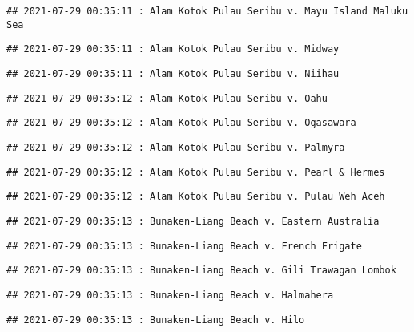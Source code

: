 \documentclass[
]{article}
\begin{document}
\begin{verbatim}
## 2021-07-29 00:35:11 : Alam Kotok Pulau Seribu v. Mayu Island Maluku Sea
\end{verbatim}

\begin{verbatim}
## 2021-07-29 00:35:11 : Alam Kotok Pulau Seribu v. Midway
\end{verbatim}

\begin{verbatim}
## 2021-07-29 00:35:11 : Alam Kotok Pulau Seribu v. Niihau
\end{verbatim}

\begin{verbatim}
## 2021-07-29 00:35:12 : Alam Kotok Pulau Seribu v. Oahu
\end{verbatim}

\begin{verbatim}
## 2021-07-29 00:35:12 : Alam Kotok Pulau Seribu v. Ogasawara
\end{verbatim}

\begin{verbatim}
## 2021-07-29 00:35:12 : Alam Kotok Pulau Seribu v. Palmyra
\end{verbatim}

\begin{verbatim}
## 2021-07-29 00:35:12 : Alam Kotok Pulau Seribu v. Pearl & Hermes
\end{verbatim}

\begin{verbatim}
## 2021-07-29 00:35:12 : Alam Kotok Pulau Seribu v. Pulau Weh Aceh
\end{verbatim}

\begin{verbatim}
## 2021-07-29 00:35:13 : Bunaken-Liang Beach v. Eastern Australia
\end{verbatim}

\begin{verbatim}
## 2021-07-29 00:35:13 : Bunaken-Liang Beach v. French Frigate
\end{verbatim}

\begin{verbatim}
## 2021-07-29 00:35:13 : Bunaken-Liang Beach v. Gili Trawagan Lombok
\end{verbatim}

\begin{verbatim}
## 2021-07-29 00:35:13 : Bunaken-Liang Beach v. Halmahera
\end{verbatim}

\begin{verbatim}
## 2021-07-29 00:35:13 : Bunaken-Liang Beach v. Hilo
\end{verbatim}
\end{document}

